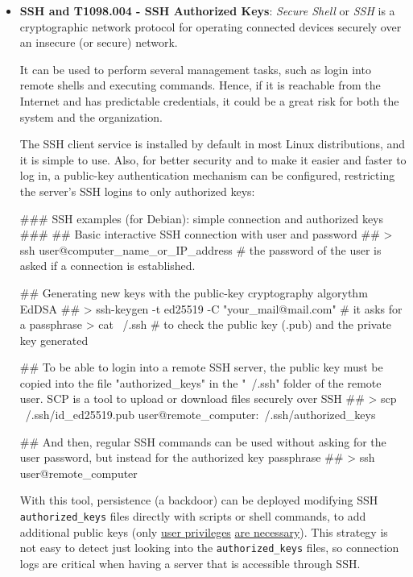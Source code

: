 \begin{itemize}
\item \textbf{SSH and T1098.004 - SSH Authorized Keys}: \textit{Secure Shell} or \textit{SSH} is a cryptographic network protocol for operating connected devices securely over an insecure (or secure) network. 

It can be used to perform several management tasks, such as login into remote shells and executing commands. Hence, if it is reachable from the Internet and has predictable credentials, it could be a great risk for both the system and the organization.

The SSH client service is installed by default in most Linux distributions, and it is simple to use. Also, for better security and to make it easier and faster to log in, a public-key authentication mechanism can be configured, restricting the server's SSH logins to only authorized keys:

\begin{spverbatim}
### SSH examples (for Debian): simple connection and authorized keys ###
## Basic interactive SSH connection with user and password ##
> ssh user@computer_name_or_IP_address   # the password of the user is asked if a connection is established.

## Generating new keys with the public-key cryptography algorythm EdDSA ##
> ssh-keygen -t ed25519 -C "your_mail@mail.com"   # it asks for a passphrase 
> cat ~/.ssh   # to check the public key (.pub) and the private key generated

## To be able to login into a remote SSH server, the public key must be copied into the file "authorized_keys" in the "~/.ssh" folder of the remote user. 
SCP is a tool to upload or download files securely over SSH ##
> scp ~/.ssh/id_ed25519.pub user@remote_computer:~/.ssh/authorized_keys

## And then, regular SSH commands can be used without asking for the user password, but instead for the authorized key passphrase ##
> ssh user@remote_computer
\end{spverbatim}
\vspace{7pt}

With this tool, persistence (a backdoor) can be deployed modifying SSH \verb|authorized_keys| files directly with scripts or shell commands, to add additional public keys (only \underline{user privileges} \underline{are necessary}). This strategy is not easy to detect just looking into the \verb|authorized_keys| files, so connection logs are critical when having a server that is accessible through SSH.


\end{itemize}
